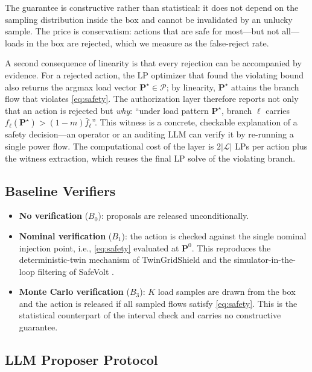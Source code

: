 \documentclass[11pt,a4paper]{article}
\begin{document}
The guarantee is constructive rather than statistical: it does not depend on the
sampling distribution inside the box and cannot be invalidated by an unlucky
sample. The price is conservatism: actions that are safe for most---but not
all---loads in the box are rejected, which we measure as the false-reject rate.

A second consequence of linearity is that every rejection can be accompanied by
evidence. For a rejected action, the LP optimizer that found the violating bound
also returns the argmax load vector $\mathbf{P}^\star \in \mathcal{P}$; by
linearity, $\mathbf{P}^\star$ attains the branch flow that violates
\eqref{eq:safety}. The authorization layer therefore reports not only that an
action is rejected but \emph{why}: ``under load pattern $\mathbf{P}^\star$,
branch $\ell$ carries $f_\ell(\mathbf{P}^\star) > (1-m)\bar f_\ell$''. This
witness is a concrete, checkable explanation of a safety decision---an operator
or an auditing LLM can verify it by re-running a single power flow. The
computational cost of the layer is $2|\mathcal{L}|$ LPs per action plus the
witness extraction, which reuses the final LP solve of the violating branch.

\subsection{Baseline Verifiers}
\label{sec:baselines}

\begin{itemize}
\item \textbf{No verification} ($B_0$): proposals are released unconditionally.
\item \textbf{Nominal verification} ($B_1$): the action is checked against the
single nominal injection point, i.e., \eqref{eq:safety} evaluated at
$\mathbf{P}^0$. This reproduces the deterministic-twin mechanism of
TwinGridShield \cite{twingridshield2026} and the simulator-in-the-loop filtering
of SafeVolt \cite{safevolt2026}.
\item \textbf{Monte Carlo verification} ($B_3$): $K$ load samples are drawn from
the box and the action is released if all sampled flows satisfy
\eqref{eq:safety}. This is the statistical counterpart of the interval check
and carries no constructive guarantee.
\end{itemize}

\subsection{LLM Proposer Protocol}
\label{sec:llm}
\end{document}
